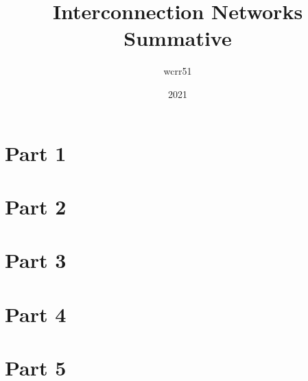 \documentclass{article}
\title{Interconnection Networks Summative}
\author{wcrr51}
\date{2021}
\begin{document}
\maketitle


\section*{Part 1}



\section*{Part 2}



\section*{Part 3}



\section*{Part 4}



\section*{Part 5}

\end{document}
